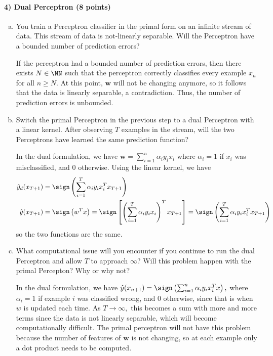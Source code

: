 \documentclass{article}
\begin{document}
\paragraph{4) Dual Perceptron (8 points)} 
\begin{enumerate}[(a)]
	\item You train a Perceptron classifier in the primal form on an infinite stream of data. This stream of data is not-linearly separable. Will the Perceptron have a bounded number of prediction errors?
		\begin{soln}
			If the perceptron had a bounded number of prediction errors, then there exists $N\in\NN$ such that the perceptron correctly classifies every example $x_n$ for all $n\ge N.$ At this point, $\mathbf{w}$ will not be changing anymore, so it follows that the data is linearly separable, a contradiction. Thus, the number of prediction errors is unbounded.
		\end{soln}

	\item Switch the primal Perceptron in the previous step to a dual Perceptron with a linear kernel. After observing $T$ examples in the stream, will the two Perceptrons have learned the same prediction function?
		\begin{soln}
			In the dual formulation, we have $\mathbf{w} = \sum_{i=1}^{n} \alpha_i y_i x_i$ where $\alpha_i=1$ if $x_i$ was misclassified, and 0 otherwise. Using the linear kernel, we have
			\begin{align*}
				\hat y_d(x_{T+1}) &= \sign\left( \sum_{i=1}^{T} \alpha_i y_i x_i^T x_{T+1} \right) \\
				\hat y(x_{T+1}) &= \sign\left( w^T x \right) = \sign\left[ \left( \sum_{i=1}^{T} \alpha_i y_i x_i \right)^T x_{T+1} \right] = \sign\left( \sum_{i=1}^{T} \alpha_i y_i x_i^T x_{T+1} \right)
			\end{align*}
			so the two functions are the same.
		\end{soln}

	\item What computational issue will you encounter if you continue to run the dual Perceptron and allow $T$ to approach $\infty$? Will this problem happen with the primal Percepton? Why or why not?
		\begin{soln}
			In the dual formulation, we have $\hat y(x_{n+1}) = \sign\left( \sum_{i=1}^{n}\alpha_i y_i x_i^T x \right),$ where $\alpha_i=1$ if example $i$ was classified wrong, and 0 otherwise, since that is when $w$ is updated each time. As $T\to\infty,$ this becomes a sum with more and more terms since the data is not linearly separable, which will become computationally difficult. The primal perceptron will not have this problem because the number of features of $\mathbf{w}$ is not changing, so at each example only a dot product needs to be computed.
		\end{soln}

\end{enumerate}
\end{document}
